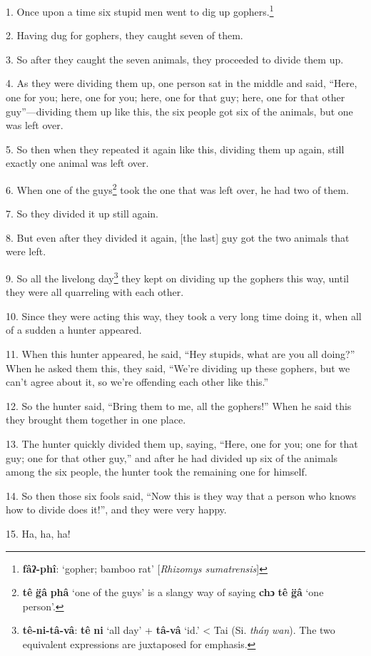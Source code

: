 \setcounter{footnote}{0}

1. Once upon a time six stupid men went to dig up gophers.\footnote{\textbf{fâʔ-phî}: `gopher; bamboo rat' [\textit{Rhizomys sumatrensis}]}

2. Having dug for gophers, they caught seven of them.

3. So after they caught the seven animals, they proceeded to divide them up.

4. As they were dividing them up, one person sat in the middle and said, ``Here,
one for you; here, one for you; here, one for that guy; here, one for that other
guy''---dividing them up like this, the six people got six of the animals, but
one was left over.

5. So then when they repeated it again like this, dividing them up again, still
exactly one animal was left over.

6. When one of the guys\footnote{\textbf{tê} \textbf{g̈â} \textbf{phâ} `one of the guys' is a slangy way of saying \textbf{chɔ} \textbf{tê} \textbf{g̈â} `one person'.} took the one that was left over, he had two of them.

7. So they divided it up still again.

8. But even after they divided it again, [the last] guy got the two animals that
were left.

9. So all the livelong day\footnote{\textbf{tê-ni-tâ-vâ}: \textbf{tê} \textbf{ni} `all day' + \textbf{tâ-vâ} `id.' < Tai (Si. \textit{tháŋ wan}). The two equivalent expressions are juxtaposed for emphasis.} they kept on dividing up the gophers this way, until
they were all quarreling with each other.

10. Since they were acting this way, they took a very long time doing it, when
all of a sudden a hunter appeared.

11. When this hunter appeared, he said, ``Hey stupids, what are you all doing?''
When he asked them this, they said, ``We're dividing up these gophers, but we can't
agree about it, so we're offending each other like this.''

12. So the hunter said, ``Bring them to me, all the gophers!'' When he said this
they brought them together in one place.

13. The hunter quickly divided them up, saying, ``Here, one for you; one for that
guy; one for that other guy,'' and after he had divided up six of the animals among
the six people, the hunter took the remaining one for himself.

14. So then those six fools said, ``Now this is they way that a person who knows
how to divide does it!'', and they were very happy.

15. Ha, ha, ha!

